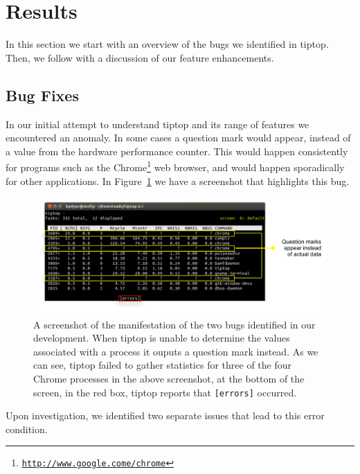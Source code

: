 \section{Results}
\label{sec:results}
In this section we start with an overview of the bugs we identified in tiptop. Then, we follow with a discussion of our feature enhancements.

\subsection{Bug Fixes}
In our initial attempt to understand tiptop and its range of features we encountered an anomaly.
In some cases a question mark would appear, instead of a value from the hardware performance counter.
This would happen consistently for programs such as the Chrome\footnote{\texttt{\url{http://www.google.come/chrome}}} web browser, and would happen sporadically for other applications.
In Figure~\ref{fig:tiptop-bug} we have a screenshot that highlights this bug.

\begin{figure}[t]
\footnotesize
\centering
\includegraphics[width=.9\textwidth]{tiptop-bug}
\caption{A screenshot of the manifestation of the two bugs identified in our development. When tiptop is unable to determine the values associated with a process it ouputs a question mark instead. As we can see, tiptop failed to gather statistics for three of the four Chrome processes in the above screenshot, at the bottom of the screen, in the red box, tiptop reports that \texttt{[errors]} occurred.}
\label{fig:tiptop-bug}
\end{figure}

Upon investigation, we identified two separate issues that lead to this error condition.

